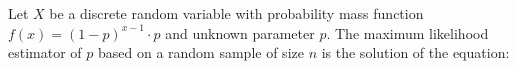 Let $X$ be a discrete random variable with probability mass function $f(x) = (1-p)^{x-1} \cdot p$ and unknown parameter $p$. 
The maximum likelihood estimator of $p$ based on a random sample of size $n$ is the solution of the equation: